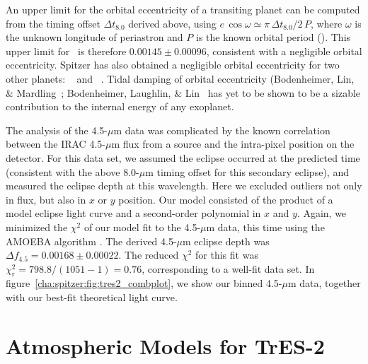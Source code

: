An upper limit for the orbital eccentricity of a transiting planet can be computed from the timing offset $\Delta t_{\mathrm {8.0}}$ derived above, using $e \, \cos{\omega} \simeq \pi \, \Delta t_{\mathrm 8.0}/2 \, P$, where $\omega$ is the unknown longitude of periastron and $P$ is the known orbital period (\citealp[see equation~4 of][]{Charbonneau_Allen_Megeath:apj:2005a}).%
This upper limit for \tresTwo\ is therefore \mbox{$0.00145\pm0.00096$}, consistent with a negligible orbital eccentricity.
Spitzer has also obtained a negligible orbital eccentricity for two other planets: \hdTZNb\ \citep{Deming_Seager_Richardson:nat:2005a} and \tresOne\ \citep{Charbonneau_Allen_Megeath:apj:2005a}.
Tidal damping of orbital eccentricity (Bodenheimer, Lin, \& Mardling~\citeyear{Bodenheimer_Lin_Mardling:apj:2001a}; Bodenheimer, Laughlin, \& Lin~\citeyear{Bodenheimer_Laughlin_Lin:apj:2003a} has yet to be shown to be a sizable contribution to the internal energy of any exoplanet.

The analysis of the 4.5-$\mu$m data was complicated by the known correlation between the IRAC 4.5-$\mu$m flux from a source and the intra-pixel position on the detector.
For this data set, we assumed the eclipse occurred at the predicted time (consistent with the above 8.0-$\mu$m timing offset for this secondary eclipse), and measured the eclipse depth at this wavelength.
Here we excluded outliers not only in flux, but also in $x$ or $y$ position.
Our model consisted of the product of a model eclipse light curve
and a second-order polynomial in $x$ and $y$.
Again, we minimized the $\chi^{2}$ of our model fit to the 4.5-$\mu$m data, this time using the AMOEBA algorithm \citep{Press_Teukolsky_Vetterling:1992a}.
The derived 4.5-$\mu$m eclipse depth was \mbox{$\Delta f_{\mathrm {4.5}} = 0.00168 \pm 0.00022$}.
The reduced $\chi^{2}$ for this fit was \mbox{$\chi_{\mathrm r}^{2} = 798.8/(1051-1)=0.76$}, corresponding to a well-fit data set.
In figure~\ref{cha:spitzer:fig:tres2_combplot}, we show our binned 4.5-$\mu$m data, together with our best-fit theoretical light curve.

\section{Atmospheric Models for TrES-2}\label{cha:spitzer:sec:atm}

